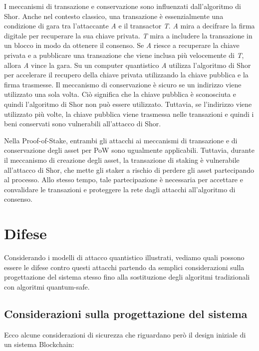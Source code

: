 I meccanismi di transazione e conservazione sono influenzati dall'algoritmo di Shor. Anche nel contesto classico, una transazione è essenzialmente una condizione di gara tra l'attaccante \textit{A} e il transactor \textit{T}. \textit{A} mira a decifrare la firma digitale per recuperare la sua chiave privata. \textit{T} mira a includere la transazione in un blocco in modo da ottenere il consenso. Se \textit{A} riesce a recuperare la chiave privata e a pubblicare una transazione che viene inclusa più velocemente di \textit{T}, allora \textit{A} vince la gara. Su un computer quantistico \textit{A} utilizza l'algoritmo di Shor per accelerare il recupero della chiave privata utilizzando la chiave pubblica e la firma trasmesse. Il meccanismo di conservazione è sicuro se un indirizzo viene utilizzato una sola volta. Ciò significa che la chiave pubblica è sconosciuta e quindi l'algoritmo di Shor non può essere utilizzato. Tuttavia, se l'indirizzo viene utilizzato più volte, la chiave pubblica viene trasmessa nelle transazioni e quindi i beni conservati sono vulnerabili all'attacco di Shor.

Nella Proof-of-Stake, entrambi gli attacchi ai meccanismi di transazione e di conservazione degli asset per PoW sono ugualmente applicabili. Tuttavia, durante il meccanismo di creazione degli asset, la transazione di staking è vulnerabile all'attacco di Shor, che mette gli staker a rischio di perdere gli asset partecipando al processo. Allo stesso tempo, tale partecipazione è necessaria per accettare e convalidare le transazioni e proteggere la rete dagli attacchi all'algoritmo di consenso.

\section{Difese}
Considerando i modelli di attacco quantistico illustrati, vediamo quali possono essere le difese contro questi attacchi partendo da semplici considerazioni sulla progettazione del sistema stesso fino alla sostituzione degli algoritmi tradizionali con algoritmi quantum-safe.

\subsection{Considerazioni sulla progettazione del sistema}
Ecco alcune considerazioni di sicurezza che riguardano però il design iniziale di un sistema Blockchain:

